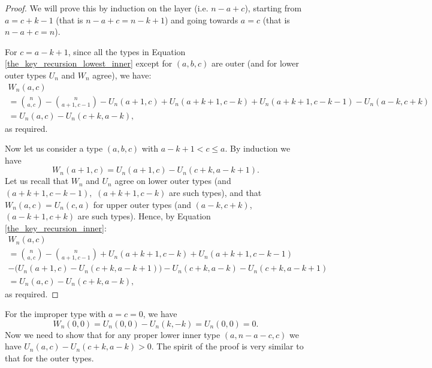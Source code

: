 \documentclass[11pt, reqno]{amsart}
\theoremstyle{remark}
\numberwithin{equation}{section}
\newcommand{\wn}{W_{n}}
\newcommand{\un}{U_{n}}
\begin{document}
\begin{proof}
    We will prove this by induction on the layer (i.e. $n-a+c$), starting from $a=c+k-1$ (that is $n-a+c=n-k+1$) and going towards $a=c$ (that is $n-a+c=n$).

    For $c=a-k+1$, since all the types in Equation \ref{the_key_recursion_lowest_inner} except for $(a, b, c)$ are outer (and for lower outer types $U_n$ and $W_n$ agree), we have:
    \begin{multline*}
        \wn(a, c)\\
        = \binom{n}{a, c}-\binom{n}{a+1, c-1} - \un(a+1, c) + \un(a+k+1, c-k) + \un(a+k+1, c-k-1) - \un(a-k, c + k)\\
        = \un(a, c) - \un(c+k, a-k),
    \end{multline*}
    as required.

    Now let us consider a type $(a, b, c)$ with $a-k+1 < c \leqslant a$. By induction we have
    \begin{equation*}
        \wn(a+1, c) = \un(a+1, c) - \un(c+k, a-k+1).
    \end{equation*}
    Let us recall that $W_n$ and $U_n$ agree on lower outer types (and $(a+k+1, c-k-1),$ $(a+k+1, c-k)$ are such types), and that $W_n(a, c)=U_n(c, a)$ for upper outer types (and $(a-k, c+k)$, $(a-k+1, c+k)$ are such types). Hence, by Equation \ref{the_key_recursion_inner}:
    \begin{multline*}
        \wn(a, c)\\ = \binom{n}{a, c}-\binom{n}{a+1, c-1} + \un(a+k+1, c-k) + \un(a+k+1, c-k-1)\\ - \big( \un(a+1, c) - \un(c+k, a-k+1) \big) - \un(c+k, a-k) - \un(c+k, a-k+1)\\
        = \un(a, c) - \un(c+k, a-k),
    \end{multline*}
    as required.
\end{proof}

For the improper type with $a=c=0$, we have
\begin{equation*}
    W_n(0, 0)=U_n(0, 0)-U_n(k, -k)=U_n(0, 0)=0.
\end{equation*}
Now we need to show that for any proper lower inner type $(a, n-a-c, c)$ we have $U_n(a, c) - U_n(c+k, a-k) > 0$. The spirit of the proof is very similar to that for the outer types.
\end{document}
